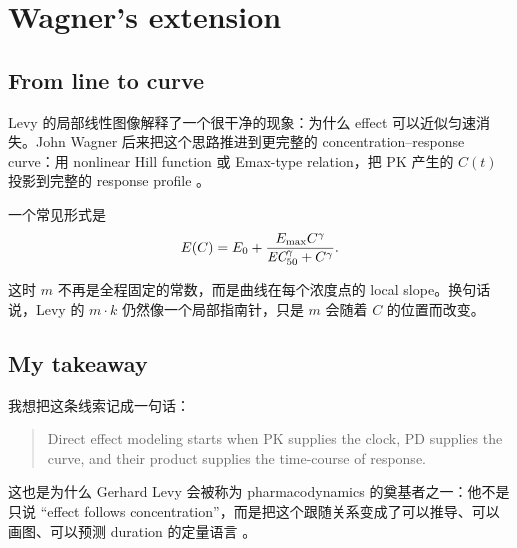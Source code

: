 \documentclass[a4paper]{article}
\begin{document}
\section{Wagner's extension}

\subsection{From line to curve}

Levy 的局部线性图像解释了一个很干净的现象：为什么 effect 可以近似匀速消失。John Wagner 后来把这个思路推进到更完整的 concentration--response curve：用 nonlinear Hill function 或 Emax-type relation，把 PK 产生的 \(C(t)\) 投影到完整的 response profile \cite{wagner1968response}。

一个常见形式是
\[
  E(C)=E_0+\frac{E_{\max} C^\gamma}{\textit{EC}_{50}^{\gamma}+C^\gamma}.
\]

这时 \(m\) 不再是全程固定的常数，而是曲线在每个浓度点的 local slope。换句话说，Levy 的 \(m\cdot k\) 仍然像一个局部指南针，只是 \(m\) 会随着 \(C\) 的位置而改变。

\subsection{My takeaway}

我想把这条线索记成一句话：

\begin{quote}
  Direct effect modeling starts when PK supplies the clock, PD supplies the curve, and their product supplies the time-course of response.
\end{quote}

这也是为什么 Gerhard Levy 会被称为 pharmacodynamics 的奠基者之一：他不是只说 ``effect follows concentration''，而是把这个跟随关系变成了可以推导、可以画图、可以预测 duration 的定量语言 \cite{levy1966kinetics,mager2024jusko}。



\end{document}
